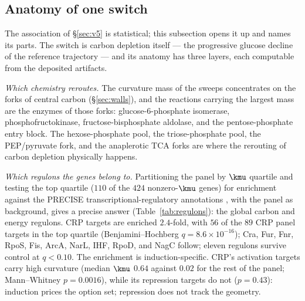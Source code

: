 \subsection{Anatomy of one switch}\label{sec:anatomy}

The association of \S\ref{sec:v5} is statistical; this subsection
opens it up and names its parts. The switch is carbon depletion
itself --- the progressive glucose decline of the reference
trajectory --- and its anatomy has three layers, each computable
from the deposited artifacts.

\emph{Which chemistry reroutes.} The curvature mass of the sweeps
concentrates on the forks of central carbon
(\S\ref{sec:walls}), and the reactions carrying the largest mass
are the enzymes of those forks: glucose-6-phosphate isomerase,
phosphofructokinase, fructose-bisphosphate aldolase, and the
pentose-phosphate entry block. The hexose-phosphate pool, the
triose-phosphate pool, the PEP/pyruvate fork, and the anaplerotic
TCA forks are where the rerouting of carbon depletion physically
happens.

\emph{Which regulons the genes belong to.} Partitioning the panel
by $\kmu$ quartile and testing the top quartile ($110$ of the
$424$ nonzero-$\kmu$ genes) for enrichment against the PRECISE
transcriptional-regulatory annotations \citep{sastry2019}, with
the panel as background, gives a precise answer
(Table~\ref{tab:regulons}): the global carbon and energy regulons.
CRP targets are enriched $2.4$-fold, with $56$ of the $89$ CRP
panel targets in the top quartile (Benjamini--Hochberg $q = 8.6
\times 10^{-16}$); Cra, Fur, Fnr, RpoS, Fis, ArcA, NarL, IHF,
RpoD, and NagC follow; eleven regulons survive control at $q <
0.10$. The enrichment is induction-specific. CRP's activation
targets carry high curvature (median $\kmu$ $0.64$ against $0.02$
for the rest of the panel; Mann--Whitney $p = 0.0016$), while its
repression targets do not ($p = 0.43$): induction prices the
option set; repression does not track the geometry.

